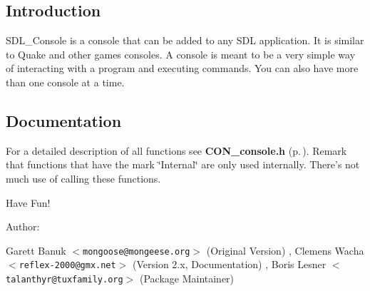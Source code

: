 

\subsection{Introduction}\label{intro}
 SDL\_\-Console is a console that can be added to any SDL application. It is similar to Quake and other games consoles. A console is meant to be a very simple way of interacting with a program and executing commands. You can also have  more than one console at a time.

\subsection{Documentation}\label{docs}
 For a detailed description of all functions see {\bf CON\_\-console.h} {\rm (p.\,\pageref{CON__console_8h})}. Remark that functions that have the mark \char`\"{}Internal\char`\"{}  are only used internally. There's not much use of calling these functions.

Have Fun!

\begin{Desc}
\item[Author: ]\par
Garett Banuk $<${\tt mongoose@mongeese.org}$>$ (Original Version) , Clemens Wacha $<${\tt reflex-2000@gmx.net}$>$ (Version 2.x, Documentation) , Boris Lesner $<${\tt talanthyr@tuxfamily.org}$>$ (Package Maintainer)\end{Desc}
